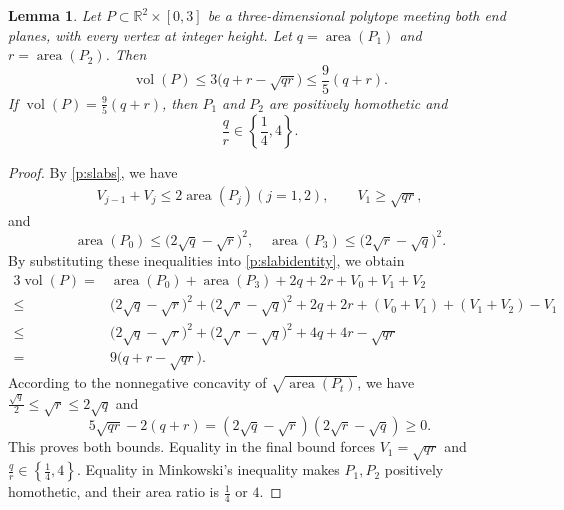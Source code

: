 \documentclass[reqno, 11pt]{article}
\numberwithin{equation}{section}
\newtheorem{lemma}[lemma]{Lemma}
\theoremstyle{definition}
\newcommand{\R}{\mathbb R}
\DeclareMathOperator{\vol}{vol}
\DeclareMathOperator{\area}{area}
\numberwithin{equation}{section}
\begin{document}
\begin{lemma}\label{w3:geometry}
Let $P\subset\R^2\times[0,3]$ be a three-dimensional polytope meeting both end planes, with every vertex at integer height.
Let $q=\area(P_1)$ and $r=\area(P_2)$. Then
\[
 \vol(P)\le3\bigl(q+r-\sqrt{qr}\bigr)\le\frac95(q+r).
\]
If $\vol(P)=\frac{9}{5}(q+r)$, then $P_1$ and $P_2$ are positively homothetic and
\begin{equation}\label{w3:equality-ratio}
 \frac{q}{r}\in\left\{\frac{1}{4},4\right\}.
\end{equation}
\end{lemma}
\begin{proof}
By \cref{p:slabs}, we have 
\begin{align*}
 V_{j-1}+V_{j}\le2\area(P_j) (j=1,2),\qquad  V_1\ge\sqrt{qr},
\end{align*}
and 
\begin{equation*}
\area(P_0)\le\bigl(2\sqrt{q}-\sqrt{r}\bigr)^2,\quad 
\area(P_3)\le\bigl(2\sqrt{r}-\sqrt{q}\bigr)^2.
\end{equation*}
By substituting these inequalities into \eqref{p:slabidentity}, we obtain
\begin{align*}
  3\vol(P)=&\area(P_0)+\area(P_3)+2q+2r+V_0+V_1+V_2\\
  \le&\bigl(2\sqrt{q}-\sqrt{r}\bigr)^2+\bigl(2\sqrt{r}-\sqrt{q}\bigr)^2+2q+2r+(V_0+V_1)+(V_1+V_2)-V_1\\
  \le&\bigl(2\sqrt{q}-\sqrt{r}\bigr)^2+\bigl(2\sqrt{r}-\sqrt{q}\bigr)^2+4q+4r-\sqrt{qr}\\
  =&9\bigl(q+r-\sqrt{qr}\bigr).
\end{align*}
According to the nonnegative concavity of $\sqrt{\area(P_t)}$, we have $\frac{\sqrt{q}}{2}\le \sqrt{r}\le2\sqrt{q}$ and 
\[
 5\sqrt{qr}-2(q+r)=(2\sqrt{q}-\sqrt{r})(2\sqrt{r}-\sqrt{q})\ge0.
\]
This proves both bounds. Equality in the final bound forces
$V_1=\sqrt{qr}$ and $\frac{q}{r}\in\left\{\frac{1}{4},4\right\}$. Equality in Minkowski's inequality
makes $P_1,P_2$ positively homothetic, and their area ratio is
$\frac{1}{4}$ or $4$.
\end{proof}
\end{document}
